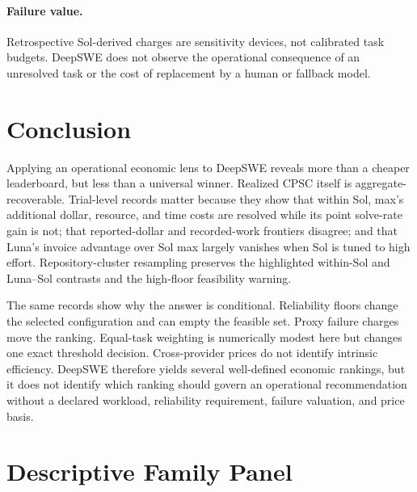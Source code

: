 \documentclass[11pt]{article}
\begin{document}
\paragraph{Failure value.}
Retrospective Sol-derived charges are sensitivity devices, not calibrated task budgets. DeepSWE
does not observe the operational consequence of an unresolved task or the cost of replacement by a
human or fallback model.

\section{Conclusion}

Applying an operational economic lens to DeepSWE reveals more than a cheaper leaderboard, but less
than a universal winner. Realized CPSC itself is aggregate-recoverable. Trial-level records matter
because they show that within Sol, max's additional dollar, resource, and time costs are resolved
while its point solve-rate gain is not; that reported-dollar and recorded-work frontiers disagree;
and that Luna's invoice advantage over Sol max largely vanishes when Sol is tuned to high effort.
Repository-cluster resampling preserves the highlighted within-Sol and Luna--Sol contrasts and the
high-floor feasibility warning.

The same records show why the answer is conditional. Reliability floors change the selected
configuration and can empty the feasible set. Proxy failure charges move the ranking. Equal-task
weighting is numerically modest here but changes one exact threshold decision. Cross-provider
prices do not identify intrinsic efficiency. DeepSWE therefore yields several well-defined
economic rankings, but it does not identify which ranking should govern an operational
recommendation without a declared workload, reliability requirement, failure valuation, and price
basis.




\appendix
\section{Descriptive Family Panel}
\end{document}
